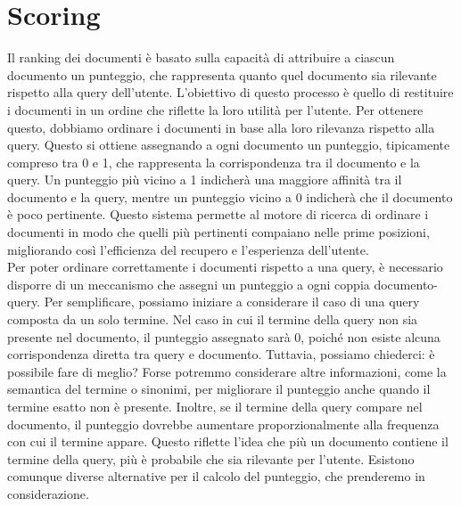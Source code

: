 \documentclass{report}
\begin{document}
	\section{Scoring}
	Il ranking dei documenti è basato sulla capacità di attribuire a ciascun documento un punteggio, che rappresenta quanto quel documento sia rilevante rispetto alla query dell'utente. L'obiettivo di questo processo è quello di restituire i documenti in un ordine che riflette la loro utilità per l'utente. Per ottenere questo, dobbiamo ordinare i documenti in base alla loro rilevanza rispetto alla query. Questo si ottiene assegnando a ogni documento un punteggio, tipicamente compreso tra 0 e 1, che rappresenta la corrispondenza tra il documento e la query. Un punteggio più vicino a 1 indicherà una maggiore affinità tra il documento e la query, mentre un punteggio vicino a 0 indicherà che il documento è poco pertinente. Questo sistema permette al motore di ricerca di ordinare i documenti in modo che quelli più pertinenti compaiano nelle prime posizioni, migliorando così l'efficienza del recupero e l'esperienza dell'utente.
	\vspace{\baselineskip}\\
	Per poter ordinare correttamente i documenti rispetto a una query, è necessario disporre di un meccanismo che assegni un punteggio a ogni coppia documento-query. Per semplificare, possiamo iniziare a considerare il caso di una query composta da un solo termine. Nel caso in cui il termine della query non sia presente nel documento, il punteggio assegnato sarà 0, poiché non esiste alcuna corrispondenza diretta tra query e documento. Tuttavia, possiamo chiederci: è possibile fare di meglio? Forse potremmo considerare altre informazioni, come la semantica del termine o sinonimi, per migliorare il punteggio anche quando il termine esatto non è presente. Inoltre, se il termine della query compare nel documento, il punteggio dovrebbe aumentare proporzionalmente alla frequenza con cui il termine appare. Questo riflette l'idea che più un documento contiene il termine della query, più è probabile che sia rilevante per l'utente. Esistono comunque diverse alternative per il calcolo del punteggio, che prenderemo in considerazione.
\end{document}
